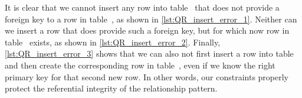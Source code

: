 It is clear that we cannot insert any row into table~ that does not provide a foreign key to a row in table~, as shown in \cref{lst:QR_insert_error_1}.
Neither can we insert a row that does provide such a foreign key, but for which now row in table~ exists, as shown in \cref{lst:QR_insert_error_2}.
Finally, \cref{lst:QR_insert_error_3} shows that we can also not first insert a row into table~ and then create the corresponding row in table~, even if we know the right primary key for that second new row.
In other words, our constraints properly protect the referential integrity of the relationship pattern.%
%
\FloatBarrier%
\endhsection%
%
